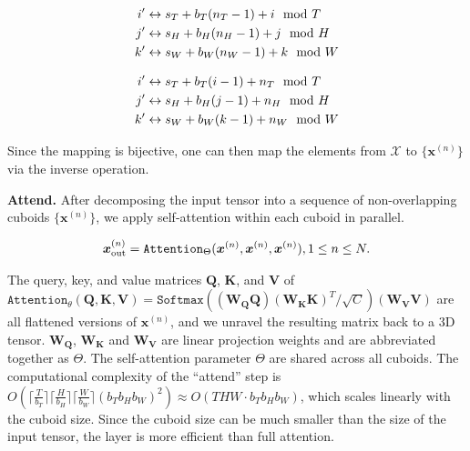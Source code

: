 \documentclass{article}
\renewcommand{\paragraph}[1]{\textbf{#1. }}
\begin{document}
\begin{minipage}{0.49\textwidth}
\begin{align}
    \centering
    \begin{aligned}
    i^\prime&\leftrightarrow s_T+b_T(n_T-1)+i\mod T \\
    j^\prime&\leftrightarrow s_H+b_H(n_H-1)+j\mod H \\
    k^\prime&\leftrightarrow s_W+b_W(n_W-1)+k\mod W
    \end{aligned}
    \label{eq:cuboid_index_map_l}
\end{align}
\end{minipage}
\begin{minipage}{0.49\textwidth}
\begin{align}
    \centering
    \begin{aligned}
    i^\prime&\leftrightarrow s_T+b_T(i-1)+n_T\mod T \\
    j^\prime&\leftrightarrow s_H+b_H(j-1)+n_H\mod H \\
    k^\prime&\leftrightarrow s_W+b_W(k-1)+n_W\mod W
    \end{aligned}
    \label{eq:cuboid_index_map_d}
\end{align}
\end{minipage}



Since the mapping is bijective, one can then map the elements from $\mathcal{X}$ to $\{\bm{x}^{(n)}\}$ via the inverse operation. 



\paragraph{Attend} 
After decomposing the input tensor into a sequence of non-overlapping cuboids $\{\bm{x}^{(n)}\}$, we apply self-attention within each cuboid in parallel.


\begin{align}
    \centering
    \bm{x}^{(n)}_{\text{out}} = \mathtt{Attention}_{\Theta}(\bm{x}^{(n)}, \bm{x}^{(n)}, \bm{x}^{(n)}), 1\leq n\leq N.
    \label{eq:cuboid_local_full_attention}
\end{align}

The query, key, and value matrices $\bm{Q}$, $\bm{K}$, and $\bm{V}$ of $\mathtt{Attention}_\theta(\bm{Q}, \bm{K}, \bm{V}) = \mathtt{Softmax}\left((\bm{W_Q}\bm{Q}) (\bm{W_K}\bm{K})^T / \sqrt{C}\right) (\bm{W_V}\bm{V})$ are all flattened versions of $\bm{x}^{(n)}$, and we unravel the resulting matrix back to a $3$D tensor. $\bm{W_Q}$, $\bm{W_K}$ and $\bm{W_V}$ are linear projection weights and are abbreviated together as $\Theta$.
The self-attention parameter $\Theta$ are shared across all cuboids. 
The computational complexity of the ``attend'' step is $O\left(\lceil \frac{T}{b_T}\rceil\lceil \frac{H}{b_H}\rceil\lceil \frac{W}{b_W}\rceil\left(b_T b_H b_W\right)^2\right) \approx O(T H W \cdot b_T b_H b_W)$, which scales linearly with the cuboid size. Since the cuboid size can be much smaller than the size of the input tensor, the layer is more efficient than full attention.
\end{document}
